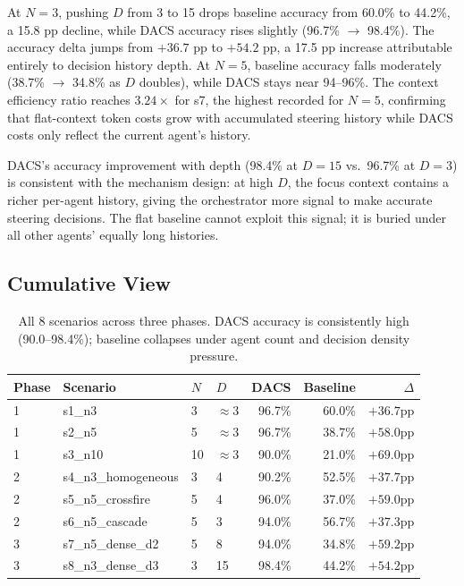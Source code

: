 \documentclass{article}
\begin{document}
At $N=3$, pushing $D$ from 3 to 15 drops baseline accuracy from 60.0\%
to 44.2\%, a 15.8 pp decline, while DACS accuracy rises slightly
(96.7\% $\to$ 98.4\%).
The accuracy delta jumps from $+36.7$ pp to $+54.2$ pp, a 17.5 pp
increase attributable entirely to decision history depth.
At $N=5$, baseline accuracy falls moderately (38.7\% $\to$ 34.8\% as
$D$ doubles), while DACS stays near 94--96\%.
The context efficiency ratio reaches $3.24\times$ for s7, the highest
recorded for $N=5$, confirming that flat-context token costs grow with
accumulated steering history while DACS costs only reflect the current
agent's history.

DACS's accuracy improvement with depth (98.4\% at $D=15$ vs.\ 96.7\%
at $D=3$) is consistent with the mechanism design: at high $D$, the
focus context contains a richer per-agent history, giving the
orchestrator more signal to make accurate steering decisions.
The flat baseline cannot exploit this signal; it is buried under all
other agents' equally long histories.

\subsection{Cumulative View}
\label{sec:cumulative}

\begin{table}[t]
\caption{All 8 scenarios across three phases.
DACS accuracy is consistently high (90.0--98.4\%); baseline collapses
under agent count and decision density pressure.}
\label{tab:all}
\centering
\small
\begin{tabular}{llllrrr}
\toprule
Phase & Scenario & $N$ & $D$ & DACS & Baseline & $\Delta$ \\
\midrule
1 & s1\_n3                & 3  & $\approx$3 & 96.7\% & 60.0\% & $+36.7$pp \\
1 & s2\_n5                & 5  & $\approx$3 & 96.7\% & 38.7\% & $+58.0$pp \\
1 & s3\_n10               & 10 & $\approx$3 & 90.0\% & 21.0\% & $+69.0$pp \\
2 & s4\_n3\_homogeneous   & 3  & 4          & 90.2\% & 52.5\% & $+37.7$pp \\
2 & s5\_n5\_crossfire     & 5  & 4          & 96.0\% & 37.0\% & $+59.0$pp \\
2 & s6\_n5\_cascade       & 5  & 3          & 94.0\% & 56.7\% & $+37.3$pp \\
3 & s7\_n5\_dense\_d2     & 5  & 8          & 94.0\% & 34.8\% & $+59.2$pp \\
3 & s8\_n3\_dense\_d3     & 3  & 15         & 98.4\% & 44.2\% & $+54.2$pp \\
\bottomrule
\end{tabular}
\end{table}
\end{document}
